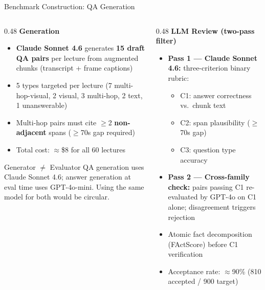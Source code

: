 \documentclass[aspectratio=169,t]{beamer}
\begin{document}
\begin{frame}{Benchmark Construction: QA Generation}

\begin{columns}[T]
\begin{column}{0.48\textwidth}
  \textbf{Generation}
  \begin{itemize}
    \item \textbf{Claude Sonnet 4.6} generates \textbf{15 draft QA pairs} per lecture
          from augmented chunks (transcript + frame captions)
    \item 5 types targeted per lecture (7 multi-hop-visual, 2 visual, 3 multi-hop,
          2 text, 1 unanswerable)
    \item Multi-hop pairs must cite $\geq$2 \textbf{non-adjacent} spans
          ($\geq$70s gap required)
    \item Total cost: $\approx$\$8 for all 60 lectures
  \end{itemize}

  \medskip
  \begin{exampleblock}{Generator $\neq$ Evaluator}
    QA generation uses Claude Sonnet 4.6; answer generation at eval time uses
    GPT-4o-mini. Using the same model for both would be circular.
  \end{exampleblock}
\end{column}
\begin{column}{0.48\textwidth}
  \textbf{LLM Review (two-pass filter)}
  \begin{itemize}
    \item \textbf{Pass 1 — Claude Sonnet 4.6:} three-criterion binary rubric:
      \begin{itemize}
        \item C1: answer correctness vs.\ chunk text
        \item C2: span plausibility ($\geq$70s gap)
        \item C3: question type accuracy
      \end{itemize}
    \item \textbf{Pass 2 — Cross-family check:} pairs passing C1 re-evaluated by
          GPT-4o on C1 alone; disagreement triggers rejection
    \item Atomic fact decomposition (FActScore) before C1 verification
    \item Acceptance rate: $\approx$90\% (810 accepted / 900 target)
  \end{itemize}
\end{column}
\end{columns}

\end{frame}
\end{document}
